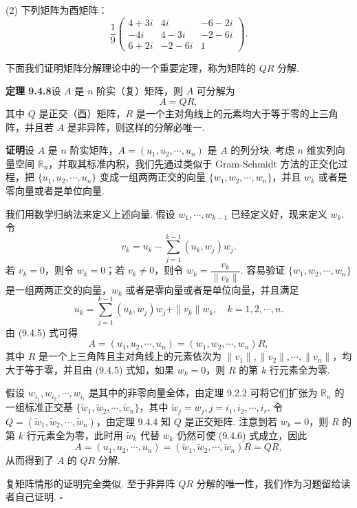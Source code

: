 \documentclass[UTF8,12pt,a4paper,fontset=fandol]{ctexart}
\begin{document}
(2) 下列矩阵为酉矩阵：
\[
  \frac19
  \left(\begin{array}{ccc}
    4+3i & 4i & -6-2i\\
    -4i & 4-3i & -2-6i\\
    6+2i & -2-6i & 1
  \end{array}\right).
\]

下面我们证明矩阵分解理论中的一个重要定理，称为矩阵的 $QR$ 分解.

\noindent\textbf{定理 9.4.8}\quad 设 $A$ 是 $n$ 阶实（复）矩阵，则 $A$ 可分解为
\[
  A=QR,
\]
其中 $Q$ 是正交（酉）矩阵，$R$ 是一个主对角线上的元素均大于等于零的上三角阵，并且若 $A$ 是非异阵，则这样的分解必唯一.

\noindent\textbf{证明}\quad 设 $A$ 是 $n$ 阶实矩阵，$A=(u_1,u_2,\cdots,u_n)$ 是 $A$ 的列分块. 考虑 $n$ 维实列向量空间 $\mathbb R_n$，并取其标准内积，我们先通过类似于 Gram-Schmidt 方法的正交化过程，把 $\{u_1,u_2,\cdots,u_n\}$ 变成一组两两正交的向量 $\{w_1,w_2,\cdots,w_n\}$，并且 $w_k$ 或者是零向量或者是单位向量.

我们用数学归纳法来定义上述向量. 假设 $w_1,\cdots,w_{k-1}$ 已经定义好，现来定义 $w_k$. 令
\[
  v_k=u_k-\sum_{j=1}^{k-1}(u_k,w_j)w_j.
\]
若 $v_k=0$，则令 $w_k=0$；若 $v_k\ne0$，则令 $w_k=\dfrac{v_k}{\|v_k\|}$. 容易验证 $\{w_1,w_2,\cdots,w_n\}$ 是一组两两正交的向量，$w_k$ 或者是零向量或者是单位向量，并且满足
\begin{equation}
  u_k=\sum_{j=1}^{k-1}(u_k,w_j)w_j+\|v_k\|w_k,\quad k=1,2,\cdots,n.
  \tag{9.4.5}
\end{equation}
由 (9.4.5) 式可得
\begin{equation}
  A=(u_1,u_2,\cdots,u_n)=(w_1,w_2,\cdots,w_n)R,
  \tag{9.4.6}
\end{equation}
其中 $R$ 是一个上三角阵且主对角线上的元素依次为 $\|v_1\|,\|v_2\|,\cdots,\|v_n\|$，均大于等于零，并且由 (9.4.5) 式知，如果 $w_k=0$，则 $R$ 的第 $k$ 行元素全为零.

假设 $w_{i_1},w_{i_2},\cdots,w_{i_r}$ 是其中的非零向量全体，由定理 9.2.2 可将它们扩张为 $\mathbb R_n$ 的一组标准正交基 $\{\widetilde w_1,\widetilde w_2,\cdots,\widetilde w_n\}$，其中 $\widetilde w_j=w_j,j=i_1,i_2,\cdots,i_r$. 令 $Q=(\widetilde w_1,\widetilde w_2,\cdots,\widetilde w_n)$，由定理 9.4.4 知 $Q$ 是正交矩阵. 注意到若 $w_k=0$，则 $R$ 的第 $k$ 行元素全为零，此时用 $\widetilde w_k$ 代替 $w_k$ 仍然可使 (9.4.6) 式成立，因此
\[
  A=(u_1,u_2,\cdots,u_n)=(\widetilde w_1,\widetilde w_2,\cdots,\widetilde w_n)R=QR,
\]
从而得到了 $A$ 的 $QR$ 分解.

复矩阵情形的证明完全类似. 至于非异阵 $QR$ 分解的唯一性，我们作为习题留给读者自己证明. $\square$
\end{document}
